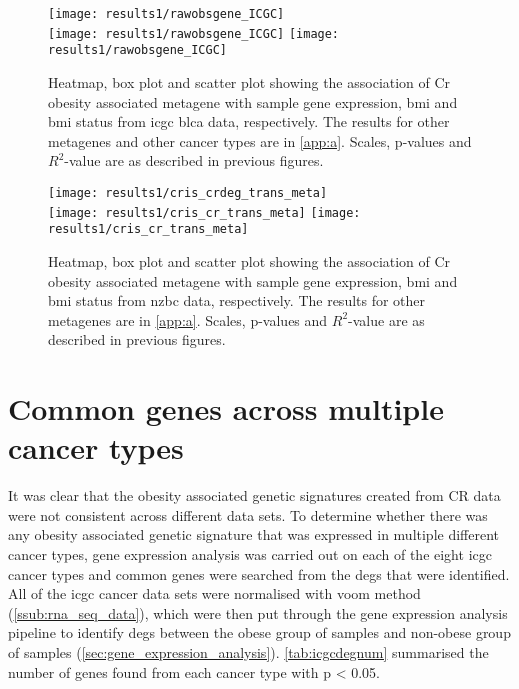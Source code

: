 \begin{figure}[htp!]
	\centering
	\texttt{[image: results1/rawobsgene\_ICGC]}\\
	\vspace{1em}
	\texttt{[image: results1/rawobsgene\_ICGC]}
	\hfill
	\texttt{[image: results1/rawobsgene\_ICGC]}
	\caption[Cr obesity associated metagene in \acrshort{icgc} \acrshort{blca} data]{Heatmap, box plot and scatter plot showing the association of Cr obesity associated metagene with sample gene expression, \gls{bmi} and \gls{bmi} status from \acrshort{icgc} \acrshort{blca} data, respectively.
	The results for other metagenes and other cancer types are in \cref{app:a}.
	Scales, p-values and $R^2$-value are as described in previous figures.}
	\label{fig:degmetaicgc}
\end{figure}

\begin{figure}[htp!]
	\centering
	\texttt{[image: results1/cris\_crdeg\_trans\_meta]}\\
	\vspace{1em}
	\texttt{[image: results1/cris\_cr\_trans\_meta]}
	\hfill
	\texttt{[image: results1/cris\_cr\_trans\_meta]}
	\caption[Cr obesity associated metagene in \gls{nzbc} data]{Heatmap, box plot and scatter plot showing the association of Cr obesity associated metagene with sample gene expression, \gls{bmi} and \gls{bmi} status from \gls{nzbc} data, respectively.
	The results for other metagenes are in \cref{app:a}.
	Scales, p-values and $R^2$-value are as described in previous figures.}
	\label{fig:degmetaprint}
\end{figure}

\section{Common genes across multiple cancer types}
\label{sec:common_genes_across_multiple_cancer_types}

It was clear that the obesity associated genetic signatures created from CR data were not consistent across different data sets.
To determine whether there was any obesity associated genetic signature that was expressed in multiple different cancer types, gene expression analysis was carried out on each of the eight \gls{icgc} cancer types and common genes were searched from the \glspl{deg} that were identified.
All of the \gls{icgc} cancer data sets were normalised with voom method (\cref{ssub:rna_seq_data}), which were then put through the gene expression analysis pipeline to identify \glspl{deg} between the obese group of samples and non-obese group of samples (\cref{sec:gene_expression_analysis}).
\cref{tab:icgcdegnum} summarised the number of genes found from each cancer type with p \textless{} 0.05.

